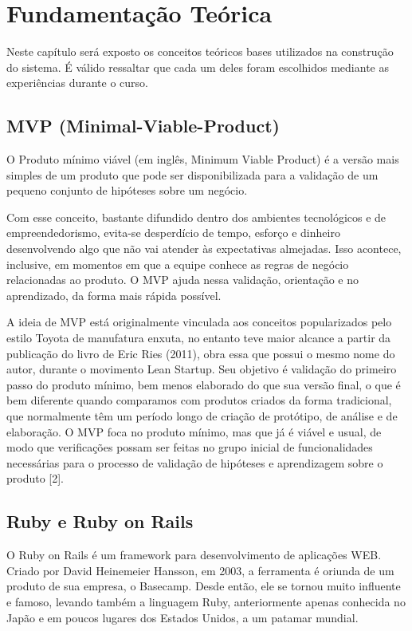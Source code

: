 \chapter{Fundamentação Teórica}

Neste capítulo será exposto os conceitos teóricos bases utilizados na construção do sistema. É válido ressaltar que cada um deles foram escolhidos mediante as experiências durante o curso.


\section{MVP (Minimal-Viable-Product)}

O Produto mínimo viável (em inglês, Minimum Viable Product) é a versão mais simples de um produto que pode ser disponibilizada para a validação de um pequeno conjunto de hipóteses sobre um negócio. 

Com esse conceito, bastante difundido dentro dos ambientes tecnológicos e de empreendedorismo, evita-se desperdício de tempo, esforço e dinheiro desenvolvendo algo que não vai atender às expectativas almejadas. Isso acontece, inclusive, em momentos em que a equipe conhece as regras de negócio relacionadas ao produto. O MVP ajuda nessa validação, orientação e no aprendizado, da forma mais rápida possível.

A ideia de MVP está originalmente vinculada aos conceitos popularizados pelo estilo Toyota de manufatura enxuta, no entanto teve maior alcance a partir da publicação do livro de Eric Ries (2011), obra essa que possui o mesmo nome do autor, durante o movimento Lean Startup. Seu objetivo é validação do primeiro passo do produto mínimo, bem menos elaborado do que sua versão final, o que é bem diferente quando comparamos com produtos criados da forma tradicional, que normalmente têm um período longo de criação de protótipo, de análise e de elaboração. O MVP foca no produto mínimo, mas que já é viável e usual, de modo que verificações possam ser feitas no grupo inicial de funcionalidades necessárias para o processo de validação de hipóteses e aprendizagem sobre o produto [2].

\section{Ruby e Ruby on Rails}

O Ruby on Rails é um framework para desenvolvimento de aplicações WEB. Criado por David Heinemeier Hansson, em 2003, a ferramenta é oriunda de um produto de sua empresa, o Basecamp. Desde então, ele se tornou muito influente e famoso, levando também a linguagem Ruby, anteriormente apenas conhecida no Japão e em poucos lugares dos Estados Unidos, a um patamar mundial.

